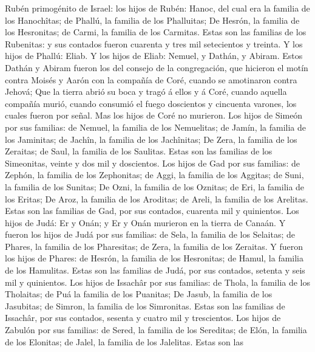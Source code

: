  Rubén primogénito de Israel: los hijos de Rubén: Hanoc, del
cual era la familia de los Hanochîtas; de Phallú, la familia de los
Phalluitas;  De Hesrón, la familia de los Hesronitas; de
Carmi, la familia de los Carmitas.  Estas son las familias
de los Rubenitas: y sus contados fueron cuarenta y tres mil setecientos
y treinta.  Y los hijos de Phallú: Eliab.  Y los
hijos de Eliab: Nemuel, y Dathán, y Abiram. Estos Dathán y Abiram fueron
los del consejo de la congregación, que hicieron el motín contra Moisés
y Aarón con la compañía de Coré, cuando se amotinaron contra Jehová;
 Que la tierra abrió su boca y tragó á ellos y á Coré,
cuando aquella compañía murió, cuando consumió el fuego doscientos y
cincuenta varones, los cuales fueron por señal.  Mas los
hijos de Coré no murieron.  Los hijos de Simeón por sus
familias: de Nemuel, la familia de los Nemuelitas; de Jamín, la familia
de los Jaminitas; de Jachîn, la familia de los Jachînitas; 
De Zera, la familia de los Zeraitas; de Saul, la familia de los
Saulitas.  Estas son las familias de los Simeonitas, veinte
y dos mil y doscientos.  Los hijos de Gad por sus familias:
de Zephón, la familia de los Zephonitas; de Aggi, la familia de los
Aggitas; de Suni, la familia de los Sunitas;  De Ozni, la
familia de los Oznitas; de Eri, la familia de los Eritas; 
De Aroz, la familia de los Aroditas; de Areli, la familia de los
Arelitas.  Estas son las familias de Gad, por sus contados,
cuarenta mil y quinientos.  Los hijos de Judá: Er y Onán; y
Er y Onán murieron en la tierra de Canaán.  Y fueron los
hijos de Judá por sus familias: de Sela, la familia de los Selaitas; de
Phares, la familia de los Pharesitas; de Zera, la familia de los
Zeraitas.  Y fueron los hijos de Phares: de Hesrón, la
familia de los Hesronitas; de Hamul, la familia de los Hamulitas.
 Estas son las familias de Judá, por sus contados, setenta
y seis mil y quinientos.  Los hijos de Issachâr por sus
familias: de Thola, la familia de los Tholaitas; de Puá la familia de
los Puanitas;  De Jasub, la familia de los Jasubitas; de
Simron, la familia de los Simronitas.  Estas son las
familias de Issachâr, por sus contados, sesenta y cuatro mil y
trescientos.  Los hijos de Zabulón por sus familias: de
Sered, la familia de los Sereditas; de Elón, la familia de los Elonitas;
de Jalel, la familia de los Jalelitas.  Estas son las
